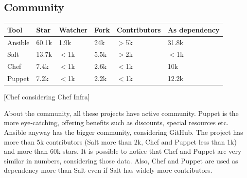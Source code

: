 \documentclass[12pt,a4paper,openright,twoside]{book}
\begin{document}
\subsection{Community}
\begin{table}[H]
    \begin{tabular}{|l|l|l|l|l|l|}
    \hline
    \textbf{Tool} & \textbf{Star}     & \textbf{Watcher}    & \textbf{Fork}          & \textbf{Contributors}          & \textbf{As dependency}          \\ \hline
    Ansible       & 60.1k             & 1.9k                & 24k                    & $>$5k                          & 31.8k                           \\ \hline 
    Salt          & 13.7k             & $<$1k               & 5.5k                   & $>$2k                          & $<$1k                           \\ \hline         
    Chef          & 7.4k              & $<$1k               & 2.6k                   & $<$1k                          & 10k                             \\ \hline
    Puppet        & 7.2k              & $<$1k               & 2.2k                   & $<$1k                          & 12.2k                           \\ \hline
    \end{tabular}
\end{table}
[Chef considering Chef Infra]

About the community, all these projects have active community. Puppet is the more eye-catching, offering benefits such as discounts, special resources etc.
Ansible anyway has the bigger community, considering GitHub. The project has more than 5k contributors (Salt more than 2k, Chef and Puppet less than 1k) and more than 60k stars.
It is possible to notice that Chef and Puppet are very similar in numbers, considering those data. Also, Chef and Puppet are used as dependency more than Salt even if Salt has widely more contributors.
\end{document}
